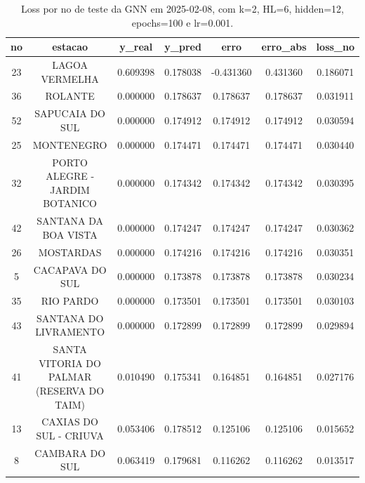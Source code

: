 \begin{table}[h]
\centering
\caption{Loss por no de teste da GNN em 2025-02-08, com k=2, HL=6, hidden=12, epochs=100 e lr=0.001.}
\label{tab:gnn_loss_k2_hl6_h12_e100_d20250208}
\begin{tabular}{ccccccc}
\toprule
no & estacao & y\_real & y\_pred & erro & erro\_abs & loss\_no \\
\midrule
23 & LAGOA VERMELHA & 0.609398 & 0.178038 & -0.431360 & 0.431360 & 0.186071 \\
36 & ROLANTE & 0.000000 & 0.178637 & 0.178637 & 0.178637 & 0.031911 \\
52 & SAPUCAIA DO SUL & 0.000000 & 0.174912 & 0.174912 & 0.174912 & 0.030594 \\
25 & MONTENEGRO & 0.000000 & 0.174471 & 0.174471 & 0.174471 & 0.030440 \\
32 & PORTO ALEGRE - JARDIM BOTANICO & 0.000000 & 0.174342 & 0.174342 & 0.174342 & 0.030395 \\
42 & SANTANA DA BOA VISTA & 0.000000 & 0.174247 & 0.174247 & 0.174247 & 0.030362 \\
26 & MOSTARDAS & 0.000000 & 0.174216 & 0.174216 & 0.174216 & 0.030351 \\
5 & CACAPAVA DO SUL & 0.000000 & 0.173878 & 0.173878 & 0.173878 & 0.030234 \\
35 & RIO PARDO & 0.000000 & 0.173501 & 0.173501 & 0.173501 & 0.030103 \\
43 & SANTANA DO LIVRAMENTO & 0.000000 & 0.172899 & 0.172899 & 0.172899 & 0.029894 \\
41 & SANTA VITORIA DO PALMAR (RESERVA DO TAIM) & 0.010490 & 0.175341 & 0.164851 & 0.164851 & 0.027176 \\
13 & CAXIAS DO SUL - CRIUVA & 0.053406 & 0.178512 & 0.125106 & 0.125106 & 0.015652 \\
8 & CAMBARA DO SUL & 0.063419 & 0.179681 & 0.116262 & 0.116262 & 0.013517 \\
\bottomrule
\end{tabular}
\end{table}
